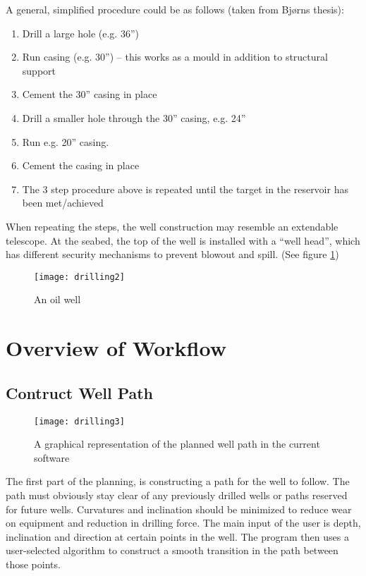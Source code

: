 \documentclass{report}
\begin{document}

A general, simplified procedure could be as follows (taken from Bjørns thesis):

\begin{enumerate}
    \item Drill a large hole (e.g. 36”)
    \item Run casing (e.g. 30”) – this works as a mould in addition to structural support
    \item Cement the 30” casing in place
    \item Drill a smaller hole through the 30” casing, e.g. 24”
    \item Run e.g. 20” casing.
    \item Cement the casing in place
    \item The 3 step procedure above is repeated until the target in the reservoir has been met/achieved
\end{enumerate}

When repeating the steps, the well construction may resemble an extendable telescope. At the seabed, the top of the well is installed with a “well head”, which has different security mechanisms to prevent blowout and spill. (See figure \ref{fig:oil_well})

\begin{figure}
    \centering
    \texttt{[image: drilling2]}
    \caption{An oil well \label{fig:oil_well}}
\end{figure}

\newpage
\section{Overview of Workflow} \label{sec:overview_of_workflow}

\subsection{Contruct Well Path}
\begin{wrapfigure}{R}{0.3\textwidth}
    \centering
    \texttt{[image: drilling3]}
    \caption{A graphical representation of the planned well path in the current software \label{fig:graphical_representation_of_planned_well_path}}
\end{wrapfigure}

The first part of the planning, is constructing a path for the well to follow. The path must obviously stay clear of any previously drilled wells or paths reserved for future wells. Curvatures and inclination should be minimized to reduce wear on equipment and reduction in drilling force. The main input of the user is depth, inclination and direction at certain points in the well. The program then uses a user-selected algorithm to construct a smooth transition in the path between those points.
\end{document}
